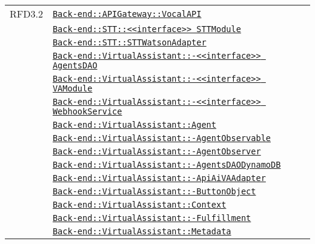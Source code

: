 \begin{longtable}{|>{\centering}m{3cm}|m{10cm}<{\centering}|}
RFD3.2 & \hyperref[Back-end::APIGateway::VocalAPI]{\texttt{Back-end::APIGateway::VocalAPI}}\\
& \hyperref[Back-end::STT::<<interface>> STTModule]{\texttt{Back-end::STT::<<interface>> STTModule}}\\
& \hyperref[Back-end::STT::STTWatsonAdapter]{\texttt{Back-end::STT::STTWatsonAdapter}}\\
& \hyperref[Back-end::VirtualAssistant::<<interface>> AgentsDAO]{\texttt{Back-end::VirtualAssistant::-\linebreak <<interface>> AgentsDAO}}\\
& \hyperref[Back-end::VirtualAssistant::<<interface>> VAModule]{\texttt{Back-end::VirtualAssistant::-\linebreak <<interface>> VAModule}}\\
& \hyperref[Back-end::VirtualAssistant::<<interface>> WebhookService]{\texttt{Back-end::VirtualAssistant::-\linebreak <<interface>> WebhookService}}\\
& \hyperref[Back-end::VirtualAssistant::Agent]{\texttt{Back-end::VirtualAssistant::Agent}}\\
& \hyperref[Back-end::VirtualAssistant::AgentObservable]{\texttt{Back-end::VirtualAssistant::-\linebreak AgentObservable}}\\
& \hyperref[Back-end::VirtualAssistant::AgentObserver]{\texttt{Back-end::VirtualAssistant::-\linebreak AgentObserver}}\\
& \hyperref[Back-end::VirtualAssistant::AgentsDAODynamoDB]{\texttt{Back-end::VirtualAssistant::-\linebreak AgentsDAODynamoDB}}\\
& \hyperref[Back-end::VirtualAssistant::ApiAiVAAdapter]{\texttt{Back-end::VirtualAssistant::-\linebreak ApiAiVAAdapter}}\\
& \hyperref[Back-end::VirtualAssistant::ButtonObject]{\texttt{Back-end::VirtualAssistant::-\linebreak ButtonObject}}\\
& \hyperref[Back-end::VirtualAssistant::Context]{\texttt{Back-end::VirtualAssistant::Context}}\\
& \hyperref[Back-end::VirtualAssistant::Fulfillment]{\texttt{Back-end::VirtualAssistant::-\linebreak Fulfillment}}\\
& \hyperref[Back-end::VirtualAssistant::Metadata]{\texttt{Back-end::VirtualAssistant::Metadata}}\\

\end{longtable}
